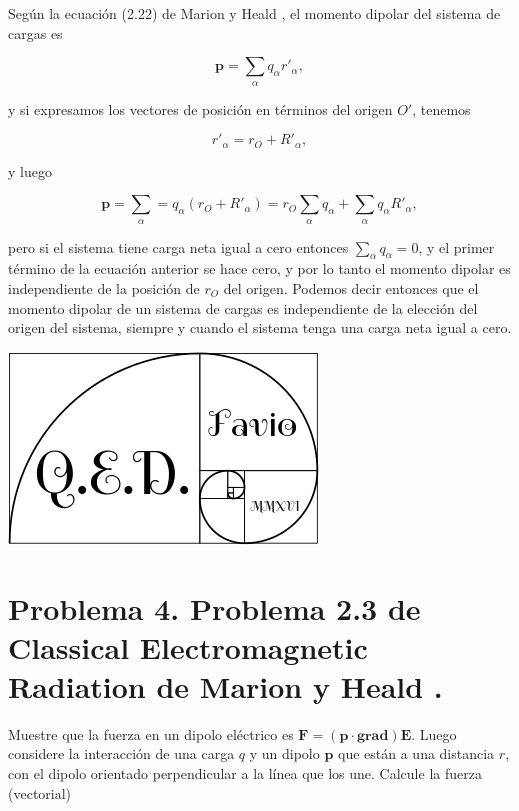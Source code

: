 \documentclass[a4paper,11pt]{article}
\numberwithin{equation}{section}
\begin{document}
Según la ecuación (2.22) de Marion y Heald \cite{marion2}, el momento dipolar del sistema 
de cargas es 

\begin{equation}
 \mathbf{p} = \sum_\alpha q_\alpha r'_\alpha,
\end{equation}

y si expresamos los vectores de posición en términos del origen $O'$, tenemos 

\begin{equation}
 r'_\alpha = r_O + R'_\alpha,
\end{equation}

y luego 

\begin{equation}
 \mathbf{p} = \sum_\alpha = q_\alpha(r_O + R'_\alpha) = r_O \sum_\alpha q_\alpha + 
 \sum_\alpha q_\alpha R'_\alpha,
\end{equation}

pero si el sistema tiene carga neta igual a cero entonces $\sum_\alpha q_\alpha = 0$, y 
el primer término de la ecuación anterior se hace cero, y por lo tanto el momento 
dipolar es independiente de la posición de $r_O$ del origen. Podemos decir 
entonces que el momento dipolar de un sistema de cargas es independiente de la elección
del origen del sistema, siempre y cuando el sistema tenga una carga neta igual a 
cero.

\hspace{10cm}\includegraphics[scale=0.25]{logoQED}

\newpage

\section{Problema 4. Problema 2.3 de Classical Electromagnetic Radiation
de Marion y Heald \cite{marion2}.}

Muestre que la fuerza en un dipolo eléctrico es $\mathbf{F} = (\mathbf{p}\cdot 
\mathbf{grad})\mathbf{E}$. Luego considere la interacción de una carga $q$ y un dipolo 
$\mathbf{p}$ que están a una distancia $r$, con el dipolo orientado perpendicular a 
la línea que los une. Calcule la fuerza (vectorial)
\end{document}
